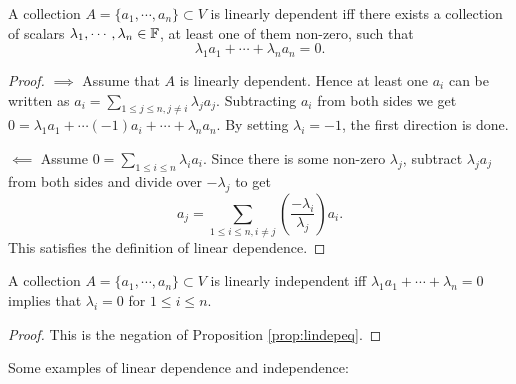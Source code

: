 \begin{proposition}\label{prop:lindepeq}
  A collection $A=\{a_1,\cdots,a_n\}\subset V$ is linearly dependent iff there exists a collection of scalars $\lambda_1,\cdots,\lambda_n\in\mathbb{F}$, at least one of them non-zero, such that
  \[
    \lambda_1 a_1 + \cdots + \lambda_n a_n = 0.
  \]
\end{proposition}
\begin{proof}
  $\implies$ Assume that $A$ is linearly dependent. Hence at least one $a_i$ can be written as $a_i=\sum_{1\leq j \leq n, j\neq i} \lambda_j a_j$. Subtracting $a_i$ from both sides we get $0=\lambda_1 a_1 + \cdots (-1) a_i + \cdots + \lambda_n a_n$. By setting $\lambda_i = -1$, the first direction is done.

  $\impliedby$ Assume $0=\sum_{1\leq i\leq n} \lambda_i a_i$. Since there is some non-zero $\lambda_j$, subtract $\lambda_j a_j$ from both sides and divide over $-\lambda_j$ to get
  \[
    a_j = \sum_{1\leq i\leq n,i\neq j} \left(\frac{-\lambda_i}{\lambda_j}\right) a_i.
  \]
  This satisfies the definition of linear dependence.
\end{proof}

\begin{proposition}\label{prop:linindep}
  A collection $A=\{a_1,\cdots,a_n\}\subset V$ is linearly independent iff $\lambda_1 a_1 + \cdots + \lambda_n = 0$ implies that $\lambda_i = 0$ for $1\leq i \leq n$.
\end{proposition}
\begin{proof}
  This is the negation of Proposition \ref{prop:lindepeq}.
\end{proof}

Some examples of linear dependence and independence:


